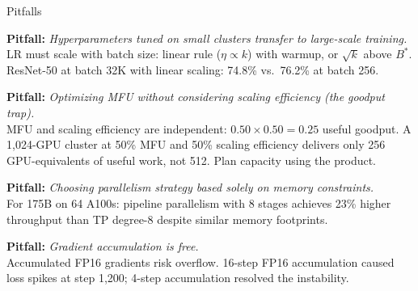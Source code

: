 \documentclass[aspectratio=169, 12pt]{beamer}
\begin{document}
\begin{frame}{Pitfalls}

\scriptsize
\textbf{Pitfall:} \textit{Hyperparameters tuned on small clusters transfer to large-scale training.}\\
LR must scale with batch size: linear rule ($\eta \propto k$) with warmup, or $\sqrt{k}$ above $B^*$. ResNet-50 at batch 32K with linear scaling: 74.8\% vs.\ 76.2\% at batch 256.

\vspace{0.05cm}
\textbf{Pitfall:} \textit{Optimizing MFU without considering scaling efficiency (the goodput trap).}\\
MFU and scaling efficiency are independent: $0.50 \times 0.50 = 0.25$ useful goodput. A 1,024-GPU cluster at 50\% MFU and 50\% scaling efficiency delivers only 256 GPU-equivalents of useful work, not 512. Plan capacity using the product.

\vspace{0.07cm}
\textbf{Pitfall:} \textit{Choosing parallelism strategy based solely on memory constraints.}\\
For 175B on 64 A100s: pipeline parallelism with 8 stages achieves 23\% higher throughput than TP degree-8 despite similar memory footprints.

\vspace{0.07cm}
\textbf{Pitfall:} \textit{Gradient accumulation is free.}\\
Accumulated FP16 gradients risk overflow. 16-step FP16 accumulation caused loss spikes at step 1,200; 4-step accumulation resolved the instability.


\end{frame}
\end{document}
